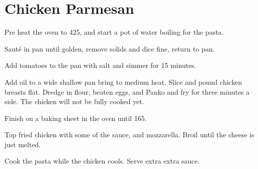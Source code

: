 \section{Chicken Parmesan}
\begin{recipe}


Pre heat the oven to 425\degree{}, and start a pot of water boiling for the pasta. 


Sauté in pan until golden, remove solids and dice fine, return to pan.


Add tomatoes to the pan with salt and simmer for 15 minutes.


Add oil to a wide shallow pan bring to medium heat. 
Slice and pound chicken breasts flat. 
Dredge in flour, beaten eggs, and Panko and fry for three minutes a side.
The chicken will not be fully cooked yet.

Finish on a baking sheet in the oven until 165\degree{}. 


Top fried chicken with some of the sauce, and mozzarella.
Broil until the cheese is just melted. 


Cook the pasta while the chicken cools. 
Serve extra extra sauce.

\end{recipe}
